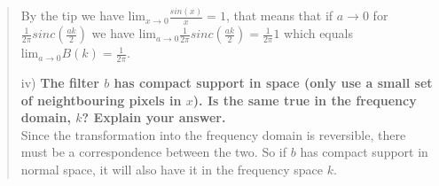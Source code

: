 \begin{quote}
\begin{itemize*}
        By the tip we have $\text{lim}_{x \rightarrow 0} \frac{sin(x)}{x} = 1$, that means that if $a \rightarrow 0$ for
        $\frac{1}{2\pi}sinc \left( \frac{ak}{2} \right)$ we have $\text{lim}_{a \rightarrow 0} \frac{1}{2\pi}sinc \left( \frac{ak}{2} \right) =
        \frac{1}{2\pi}1$ which equals $\text{lim}_{a \rightarrow 0} B(k) = \frac{1}{2\pi}$.


    \item[iv)] \textbf{The filter $b$ has compact support in space (only use a
        small set of neightbouring pixels in $x$). Is the same true in the
        frequency domain, $k$? Explain your answer.}\\
        
    Since the transformation into the frequency domain is reversible, there must be a correspondence
    between the two. So if $b$ has compact support in normal space, it will also have it in the
    frequency space $k$.
  \end{itemize*}
\end{quote}